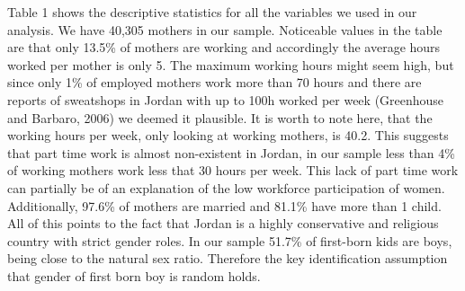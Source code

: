 \documentclass[12pt,draft,a4paper]{article}
\begin{document}
Table 1 shows the descriptive statistics for all the variables we used in our analysis. We have 40,305 mothers in our sample.
Noticeable values in the table are that only 13.5\% of mothers are working and accordingly the average hours worked per mother is only 5.
The maximum working hours might seem high,
but since only 1\% of employed mothers work more than 70 hours and there are reports of sweatshops in Jordan with up to 100h worked per week (Greenhouse and Barbaro, 2006) we deemed it plausible.
It is worth to note here, that the working hours per week, only looking at working mothers, is 40.2.
This suggests that part time work is almost non-existent in Jordan, in our sample less than 4\% of working mothers work less that 30 hours per week.
This lack of part time work can partially be of an explanation of the low workforce participation of women. 
Additionally, 97.6\% of mothers are married and 81.1\% have more than 1 child.
All of this points to the fact that Jordan is a highly conservative and religious country with strict gender roles.
In our sample 51.7\% of first-born kids are boys, being close to the natural sex ratio. Therefore the key identification assumption that gender of first born boy is random holds.
    
\end{document}
